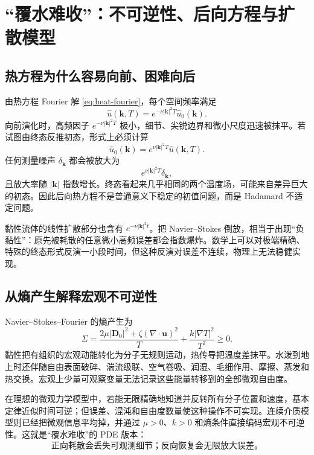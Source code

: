 \documentclass[cn,hazy,blue,11pt,normal]{elegantnote}
\numberwithin{equation}{section}
\newcommand{\vct}[1]{\bm{#1}}
\newcommand{\ten}[1]{\bm{#1}}
\begin{document}
\section{“覆水难收”：不可逆性、后向方程与扩散模型}

\subsection{热方程为什么容易向前、困难向后}

由热方程 Fourier 解 \eqref{eq:heat-fourier}，每个空间频率满足
\begin{equation}
 \widehat u(\vct k,T)
 =e^{-\nu|\vct k|^2T}\widehat u_0(\vct k).
\end{equation}
向前演化时，高频因子 $e^{-\nu|\vct k|^2T}$ 极小，细节、尖锐边界和微小尺度迅速被抹平。若试图由终态反推初态，形式上必须计算
\begin{equation}
 \boxed{\widehat u_0(\vct k)
 =e^{\nu|\vct k|^2T}\widehat u(\vct k,T).} \label{eq:backward-heat}
\end{equation}
任何测量噪声 $\delta_{\vct k}$ 都会被放大为
\begin{equation}
 e^{\nu|\vct k|^2T}\delta_{\vct k},
\end{equation}
且放大率随 $|\vct k|$ 指数增长。终态看起来几乎相同的两个温度场，可能来自差异巨大的初态。因此后向热方程不是普通意义下稳定的初值问题，而是 Hadamard 不适定问题。

黏性流体的线性扩散部分也含有 $e^{-\nu|\vct k|^2t}$。把 Navier--Stokes 倒放，相当于出现“负黏性”：原先被耗散的任意微小高频误差都会指数爆炸。数学上可以对极端精确、特殊的终态形式反演一小段时间，但这种反演对误差不连续，物理上无法稳健实现。

\subsection{从熵产生解释宏观不可逆性}

Navier--Stokes--Fourier 的熵产生为
\begin{equation}
 \Sigma=\frac{2\mu|\ten D_0|^2+\zeta(\nabla\cdot\vct u)^2}{T}
 +\frac{k|\nabla T|^2}{T^2}\ge0.
\end{equation}
黏性把有组织的宏观动能转化为分子无规则运动，热传导把温度差抹平。水泼到地上时还伴随自由表面破碎、湍流级联、空气卷吸、润湿、毛细作用、摩擦、蒸发和热交换。宏观上少量可观察变量无法记录这些能量转移到的全部微观自由度。

在理想的微观力学模型中，若能无限精确地知道并反转所有分子位置和速度，基本定律近似时间可逆；但误差、混沌和自由度数量使这种操作不可实现。连续介质模型则已经把微观信息平均掉，并通过 $\mu>0$、$k>0$ 和熵条件直接编码宏观不可逆性。这就是“覆水难收”的 PDE 版本：
\begin{equation}
 \boxed{\text{正向耗散会丢失可观测细节；反向恢复会无限放大误差。}}
\end{equation}
\end{document}
